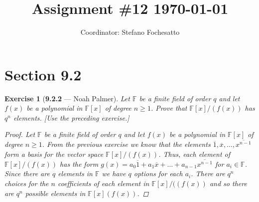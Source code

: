 \documentclass[12pt]{amsart}
\title{Assignment \#12 \today}
\author{Coordinator: Stefano Fochesatto}
\newtheorem{exercise}[theorem]{Exercise}
\theoremstyle{remark}
\newcommand{\FF}{{\mathbb F}}
\theoremstyle{mycomment}
\begin{document}
\maketitle
\doublespacing %


\section*{Section 9.2}

\begin{exercise}[\textbf{9.2.2} --- Noah Palmer] Let $\FF$ be a finite field of order $q$ and let $f(x)$ be a polynomial in $\FF[x]$ of degree $n\ge 1$. Prove that $\FF[x]/(f(x))$ has $q^n$ elements. [Use the preceding exercise.]
  \begin{proof}
  Let $\FF$ be a finite field of order $q$ and let $f(x)$ be a polynomial in $\FF[x]$ of degree $n\ge 1$. From the previous exercise we know that the elements $\overline{1}, \overline{x} ,\ldots,\overline{x^{n-1}}$ form a basis for the vector space $\FF[x]/(f(x))$. Thus, each element of $\FF[x]/(f(x))$ has the form $g(x)=a_0\overline{1}+a_1\overline{x}+\ldots+a_{n-1}\overline{x^{n-1}}$ for $a_i\in\FF$. Since there are $q$ elements in $\FF$ we have $q$ options for each $a_i$. There are $q^n$ choices for the $n$ coefficients of each element in $\FF[x]/((f(x))$ and so there are $q^n$ possible elements in $\FF[x](f(x))$.
  \end{proof}
  \end{exercise}
  \vspace{.15in}
\end{document}
